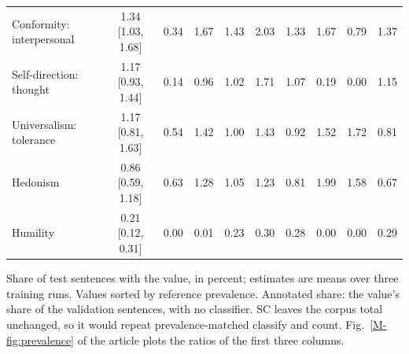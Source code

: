 \begin{table}[t]
\begin{tabular*}{\textwidth}{@{\extracolsep{\fill}}lccccccccc@{}}
Conformity: interpersonal & 1.34 [1.03, 1.68] & 0.34 & 1.67 & 1.43 & 2.03 & 1.33 & 1.67 & 0.79 & 1.37 \\
Self-direction: thought & 1.17 [0.93, 1.44] & 0.14 & 0.96 & 1.02 & 1.71 & 1.07 & 0.19 & 0.00 & 1.15 \\
Universalism: tolerance & 1.17 [0.81, 1.63] & 0.54 & 1.42 & 1.00 & 1.43 & 0.92 & 1.52 & 1.72 & 0.81 \\
Hedonism & 0.86 [0.59, 1.18] & 0.63 & 1.28 & 1.05 & 1.23 & 0.81 & 1.99 & 1.58 & 0.67 \\
Humility & 0.21 [0.12, 0.31] & 0.00 & 0.01 & 0.23 & 0.30 & 0.28 & 0.00 & 0.00 & 0.29 \\
\bottomrule
\end{tabular*}
\par\vspace{2pt}
\begin{minipage}{\textwidth}\scriptsize Share of test sentences with the value, in percent; estimates are means over three training runs. Values sorted by reference prevalence. Annotated share: the value's share of the validation sentences, with no classifier. SC leaves the corpus total unchanged, so it would repeat prevalence-matched classify and count. Fig.~\ref{M-fig:prevalence} of the article plots the ratios of the first three columns.\end{minipage}
\end{table}
